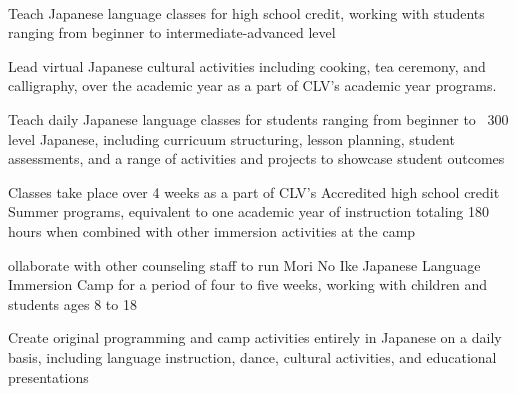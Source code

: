 \documentclass[letterpaper]{deedy-resume_sm} %
\begin{document}
\sectionspace %
\\
\vspace{\topsep} %
\begin{tightitemize}
\item Teach Japanese language classes for high school credit, working with students ranging from beginner to intermediate-advanced level
\item Lead virtual Japanese cultural activities including cooking, tea ceremony, and calligraphy, over the academic year as a part of CLV's academic year programs.
\end{tightitemize}
\vspace{\topsep} %
\begin{tightitemize}
\item Teach daily Japanese language classes for students ranging from beginner to ~300 level Japanese, including curricuum structuring, lesson planning, student assessments, and a range of activities and projects to showcase student outcomes
\item Classes take place over 4 weeks as a part of CLV's Accredited high school credit Summer programs, equivalent to one academic year of instruction totaling 180 hours when combined with other immersion activities at the camp
\end{tightitemize}
\vspace{\topsep} %
\begin{tightitemize}
\item ollaborate with other counseling staff to run Mori No Ike Japanese Language Immersion Camp for a period of four to five weeks, working with children and students ages 8 to 18
\item Create original programming and camp activities entirely in Japanese on a daily basis, including language instruction, dance, cultural activities, and educational presentations
\end{tightitemize}
\end{document}
